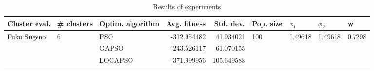 \begin{table}
\centering
\caption{Results of experiments}
\begin{tabular}{lllrrllll}
\toprule
               Cluster eval. &        \# clusters & Optim. algorithm &  Avg. fitness &  Std. dev. &            Pop. size &               $\phi_{1}$ &               $\phi_{2}$ &                       w \\
\midrule
\multirow{3}{*}{Fuku Sugeno} & \multirow{3}{*}{6} &              PSO &   -312.954482 &  41.934021 & \multirow{3}{*}{100} & \multirow{3}{*}{1.49618} & \multirow{3}{*}{1.49618} & \multirow{3}{*}{0.7298} \\
                             &                    &            GAPSO &   -243.526117 &  61.070155 &                      &                          &                          &                         \\
                             &                    &          LOGAPSO &   -371.999956 & 105.649588 &                      &                          &                          &                         \\
\bottomrule
\end{tabular}
\end{table}
